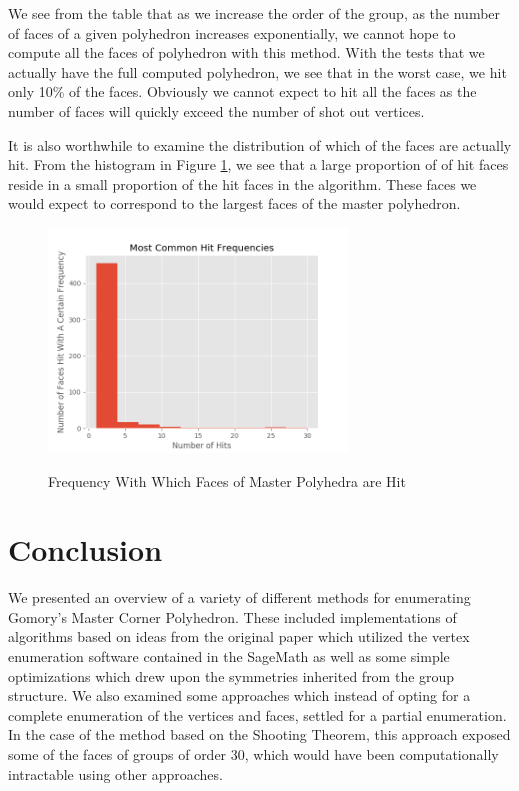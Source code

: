 \documentclass{article}
\begin{document}
	We see from the table that as we increase the order of the group, as the number of faces of a given polyhedron increases exponentially, we cannot hope to compute all the faces of polyhedron with this method. With the tests that we actually have the full computed polyhedron, we see that in the worst case, we hit only 10\% of the faces. Obviously we cannot expect to hit all the faces as the number of faces will quickly exceed the number of shot out vertices.
	
	It is also worthwhile to examine the distribution of which of the faces are actually hit. From the histogram in Figure \ref{histogram}, we see that a large proportion of of hit faces reside in a small proportion of the hit faces in the algorithm. These faces we would expect to correspond to the largest faces of the master polyhedron.
	
	\begin{figure}
		\includegraphics[width=300px]{histogram.png}
		\label{histogram}
		\caption{Frequency With Which Faces of Master Polyhedra are Hit}
	\end{figure}
	
	
	\section{Conclusion}
	We presented an overview of a variety of different methods for enumerating Gomory's Master Corner Polyhedron. These included implementations of algorithms based on ideas from the original paper which utilized the vertex enumeration software contained in the SageMath as well as some simple optimizations which drew upon the symmetries inherited from the group structure. We also examined some approaches which instead of opting for a complete enumeration of the vertices and faces, settled for a partial enumeration.
	In the case of the method based on the Shooting Theorem, this approach exposed some of the faces of groups of order 30, which would have been computationally intractable using other approaches.
	
\end{document}
